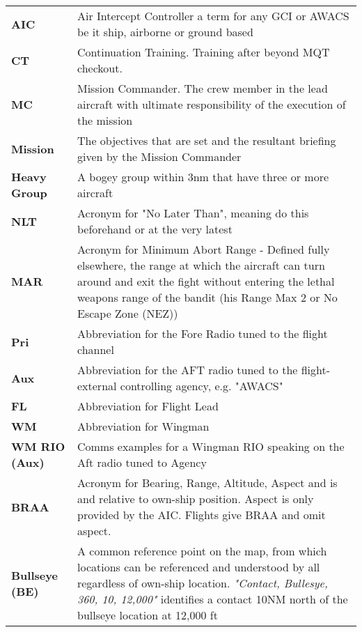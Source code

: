\renewcommand\arraystretch{1.5}\begin{tabularx}{\textwidth}{lX}

  \textbf{AIC} & Air Intercept Controller a term for any GCI or AWACS be it
    ship, airborne or ground based
  \\
  \textbf{CT} & Continuation Training. Training after beyond MQT checkout.
  \\\textbf{MC} & Mission Commander. The crew member in the lead aircraft with
    ultimate responsibility of the execution of the mission
  \\\textbf{Mission} & The objectives that are set and the resultant briefing
  given by the Mission Commander
  \\
  \textbf{Heavy Group} & A bogey group within 3nm that have three or more
  aircraft
  \\
  \textbf{NLT} & Acronym for "No Later Than", meaning do this beforehand or at
  the very latest
  \\
  \textbf{MAR} & Acronym for Minimum Abort Range - Defined fully elsewhere, the
  range at which the aircraft can turn around and exit the fight without
  entering the lethal weapons range of the bandit (his Range Max 2 or No Escape
  Zone (NEZ))
  \\
  \textbf{Pri} & Abbreviation for the Fore Radio tuned to the flight channel
  \\
  \textbf{Aux} & Abbreviation for the AFT radio tuned to the flight-external
    controlling agency, e.g. "AWACS"
  \\
  \textbf{FL} & Abbreviation for Flight Lead
  \\
  \textbf{WM} & Abbreviation for Wingman
  \\
  \textbf{WM RIO (Aux)} & Comms examples for a Wingman RIO speaking on the Aft
  radio tuned to Agency
  \\
  \textbf{BRAA} & Acronym for Bearing, Range, Altitude, Aspect and is and
    relative to own-ship position. Aspect is only provided by the AIC. Flights
    give BRAA and omit aspect.
  \\
  \textbf{Bullseye (BE)} & A common reference point on the map, from which
    locations can be referenced and understood by all regardless of own-ship
    location. \textit{"Contact, Bullesye, 360, 10, 12,000"} identifies a
    contact 10NM north of the bullseye location at 12,000 ft
\end{tabularx}


\newpage

